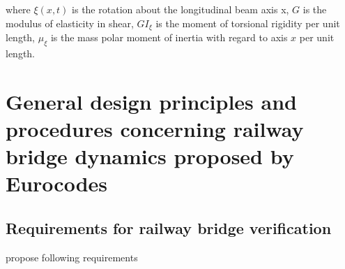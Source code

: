 where $ \xi (x,t) $ is the rotation about the longitudinal beam axis x, $ G $ is the modulus of elasticity in shear, $ GI_\xi $ is the moment of torsional rigidity per unit length, $ \mu_\xi $ is the mass polar moment of inertia with regard to axis $ x $ per unit length.

\section{General design principles and procedures concerning railway bridge dynamics proposed by Eurocodes }


\subsection{Requirements for railway bridge verification}
\cite{EC0} propose following requirements


